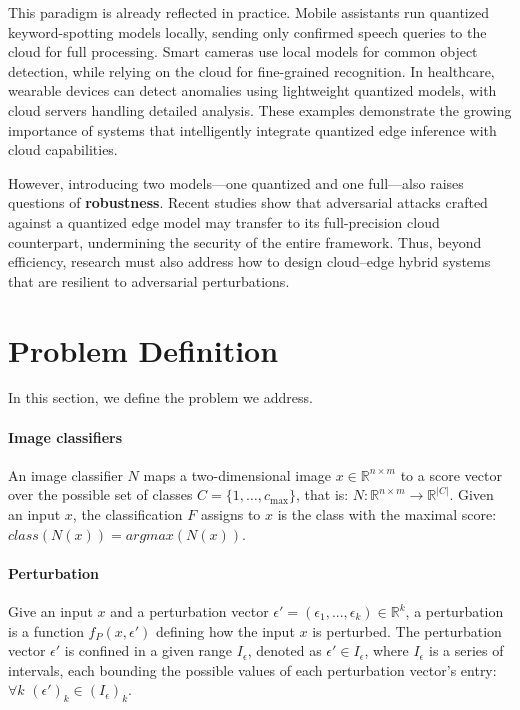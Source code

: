 \documentclass[11pt]{article}
\begin{document}
This paradigm is already reflected in practice. Mobile assistants run
quantized keyword-spotting models locally, sending only confirmed speech
queries to the cloud for full processing. Smart cameras use local models
for common object detection, while relying on the cloud for fine-grained
recognition. In healthcare, wearable devices can detect anomalies using
lightweight quantized models, with cloud servers handling detailed
analysis. These examples demonstrate the growing importance of systems
that intelligently integrate quantized edge inference with cloud
capabilities.

However, introducing two models—one quantized and one full—also raises
questions of \textbf{robustness}. Recent studies show that adversarial
attacks crafted against a quantized edge model may transfer to its
full-precision cloud counterpart, undermining the security of the entire
framework. Thus, beyond efficiency, research must also address how to
design cloud–edge hybrid systems that are resilient to adversarial
perturbations.


\section{Problem Definition}
In this section, we define the problem we address.

\paragraph{Image classifiers}
An image classifier $N$ maps a two-dimensional image $x\in \mathbb{R}^{n \times m}$ to a score vector over the possible set of classes $C=\{1,\ldots,c_\text{max}\}$, that is:
$N: \mathbb{R}^{n \times m} \rightarrow {\mathbb{R}}^{|C|}$.
Given an input $x$, the classification $F$ assigns to $x$ is the class with the maximal score: $class(N(x))=argmax(N(x))$.

\paragraph{Perturbation}
Give an input $x$ and a perturbation vector $\epsilon'=(\epsilon_1,...,\epsilon_k)\in{\mathbb{R}}^{k}$, a perturbation is a function $f_P(x,\epsilon')$ defining how the input $x$ is perturbed. The perturbation vector $\epsilon'$ is confined in a given range $I_\epsilon$, denoted as $\epsilon'\in I_\epsilon$, where $I_\epsilon$ is a series of intervals, each bounding the possible values of each perturbation vector's entry: $\forall{k}$ $(\epsilon')_k\in (I_\epsilon)_k$.
\end{document}
